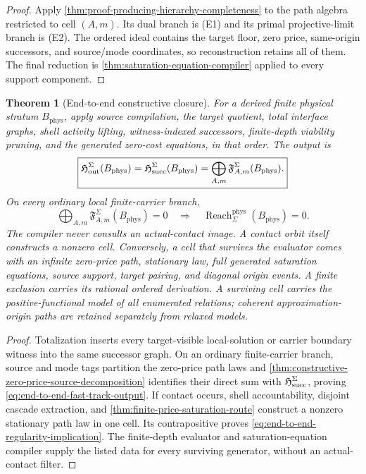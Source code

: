 \documentclass[11pt]{article}
\numberwithin{section}{part}
\theoremstyle{plain}
\newtheorem{theorem}{Theorem}[section]
\theoremstyle{definition}
\theoremstyle{remark}
\newcommand{\Reach}{\operatorname{Reach}}
\newcommand{\Phys}{\mathrm{phys}}
\newcommand{\Budget}{B_{\Phys}}
\begin{document}
\begin{proof}
Apply \cref{thm:proof-producing-hierarchy-completeness} to the path algebra
restricted to cell \((A,m)\).  Its dual branch is \textup{(E1)} and its primal
projective-limit branch is \textup{(E2)}.  The ordered ideal contains the
target floor, zero price, same-origin successors, and source/mode coordinates,
so reconstruction retains all of them.  The final reduction is
\cref{thm:saturation-equation-compiler} applied to every support component.
\end{proof}

\begin{theorem}[End-to-end constructive closure]
\label{thm:end-to-end-fast-track-completeness}
For a derived finite physical stratum \(\Budget\), apply source compilation,
the target quotient, total interface graphs, shell activity lifting,
witness-indexed successors, finite-depth viability pruning, and the generated
zero-cost equations, in that order.  The output is
\begin{equation}
 \label{eq:end-to-end-fast-track-output}
 \boxed{
 \mathfrak H_{\rm out}^{\Sigma}(\Budget)
 =\mathfrak H_{\rm succ}^{\Sigma}(\Budget)
 =\bigoplus_{A,m}\mathfrak F_{A,m}^{\Sigma}(\Budget).}
\end{equation}
On every ordinary local finite-carrier branch,
\begin{equation}
 \label{eq:end-to-end-regularity-implication}
 \bigoplus_{A,m}\mathfrak F_{A,m}^{\Sigma}(\Budget)=0
 \quad\Longrightarrow\quad
 \Reach_\Sigma^{\Phys}(\Budget)=0.
\end{equation}
The compiler never consults an actual-contact image.  A contact orbit itself
constructs a nonzero cell.  Conversely, a cell that survives the evaluator
comes with an infinite zero-price path, stationary law, full generated
saturation equations, source support, target pairing, and diagonal origin
events.  A finite exclusion carries its rational ordered derivation.  A
surviving cell carries the positive-functional model of all enumerated
relations; coherent approximation-origin paths are retained separately from
relaxed models.
\end{theorem}

\begin{proof}
Totalization inserts every target-visible local-solution or carrier boundary
witness into the same successor graph.  On an ordinary finite-carrier branch,
source and mode tags partition the zero-price path laws and
\cref{thm:constructive-zero-price-source-decomposition} identifies their
direct sum with \(\mathfrak H_{\rm succ}^{\Sigma}\), proving
\eqref{eq:end-to-end-fast-track-output}.  If contact occurs, shell
accountability, disjoint cascade extraction, and
\cref{thm:finite-price-saturation-route} construct a nonzero stationary path
law in one cell.  Its contrapositive proves
\eqref{eq:end-to-end-regularity-implication}.  The finite-depth evaluator and
saturation-equation compiler supply the listed data for every surviving
generator, without an actual-contact filter.
\end{proof}
\end{document}

